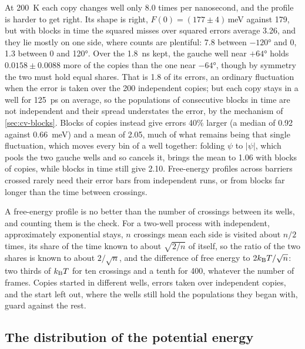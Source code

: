 At \SI{200}{\kelvin} each copy changes well only 8.0 times per
nanosecond, and the profile is harder to get right. Its shape is right,
$F(0) = (177 \pm 4)$\,\si{\milli\electronvolt} against 179, but with blocks
in time the squared misses over squared errors average 3.26, and they lie
mostly on one side, where counts are plentiful: 7.8 between $-\ang{120}$
and 0, 1.3 between 0 and \ang{120}. Over the \SI{1.8}{\nano\second} kept,
the gauche well near $+\ang{64}$ holds $0.0158 \pm 0.0088$ more of the
copies than the one near $-\ang{64}$, though by symmetry the two must hold
equal shares. That is
1.8 of its errors, an ordinary fluctuation when the error is taken over
the 200 independent copies; but each copy stays in a well for
\SI{125}{\pico\second} on average, so the populations of consecutive blocks in time
are not independent and their spread understates the error, by the mechanism of
\cref{sec:cv-blocks}. Blocks of copies instead give errors 40\% larger
(a median of 0.92 against \SI{0.66}{\milli\electronvolt}) and a mean of
2.05, much of what remains being that single fluctuation, which moves
every bin of a well together: folding $\psi$ to $\lvert\psi\rvert$, which
pools the two gauche wells and so cancels it, brings the mean to 1.06
with blocks of copies, while blocks in time still give 2.10. Free-energy profiles across barriers
crossed rarely need their error bars from independent runs, or from
blocks far longer than the time between crossings.

\begin{practice}
A free-energy profile is no better than the number of crossings between
its wells, and counting them is the check. For a two-well process with independent, approximately exponential stays,
$n$ crossings mean each side
is visited about $n/2$ times, its share of the time known to about
$\sqrt{2/n}$ of itself, so the ratio of the two shares is known to about
$2/\sqrt n$, and the difference of free energy to $2k_{\mathrm{B}} T/\sqrt n$: two
thirds of $k_{\mathrm{B}} T$ for ten crossings and a tenth for 400, whatever the
number of frames. Copies started in different wells, errors taken over
independent copies, and the start left out, where the wells still hold
the populations they began with, guard against the rest.
\end{practice}

\subsection*{The distribution of the potential energy}

